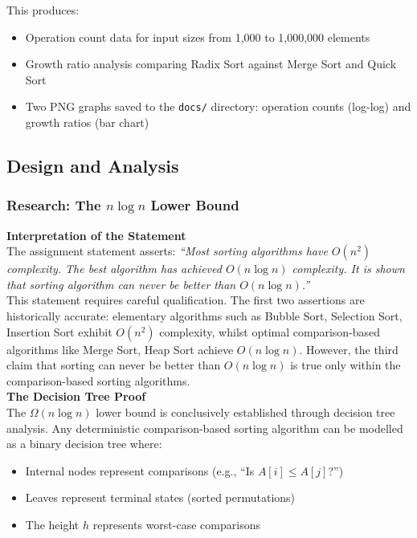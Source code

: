 \documentclass[12pt]{article}
\begin{document}
This produces:
\begin{itemize}
    \item Operation count data for input sizes from 1,000 to 1,000,000 elements
    \item Growth ratio analysis comparing Radix Sort against Merge Sort and Quick Sort
    \item Two PNG graphs saved to the \texttt{docs/} directory: operation counts (log-log) and growth ratios (bar chart)
\end{itemize}

\newpage
\subsection{Design and Analysis}

\subsubsection{Research: The $n \log n$ Lower Bound}

\textbf{Interpretation of the Statement}\\

The assignment statement asserts: \emph{``Most sorting algorithms have $O(n^{2})$ complexity. The best algorithm has achieved $O(n \log n)$ complexity. It is shown that sorting algorithm can never be better than $O(n \log n)$.''}\\

This statement requires careful qualification. The first two assertions are historically accurate: elementary algorithms such as Bubble Sort, Selection Sort, Insertion Sort exhibit $O(n^{2})$ complexity, whilst optimal comparison-based algorithms like Merge Sort, Heap Sort achieve $O(n \log n)$. However, the third claim that sorting can never be better than $O(n \log n)$ is true only within the comparison-based sorting algorithms.\\

\noindent\textbf{The Decision Tree Proof}\\

The $\Omega(n \log n)$ lower bound is conclusively established through decision tree analysis. Any deterministic comparison-based sorting algorithm can be modelled as a binary decision tree where:
\begin{itemize}
    \item Internal nodes represent comparisons (e.g., ``Is $A[i] \le A[j]$?'')
    \item Leaves represent terminal states (sorted permutations)
    \item The height $h$ represents worst-case comparisons
\end{itemize}
\end{document}

